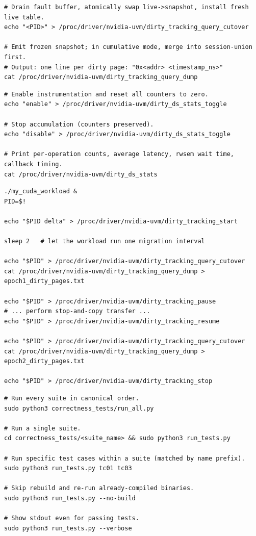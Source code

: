 
\begin{lstlisting}
# Drain fault buffer, atomically swap live->snapshot, install fresh live table.
echo "<PID>" > /proc/driver/nvidia-uvm/dirty_tracking_query_cutover

# Emit frozen snapshot; in cumulative mode, merge into session-union first.
# Output: one line per dirty page: "0x<addr> <timestamp_ns>"
cat /proc/driver/nvidia-uvm/dirty_tracking_query_dump
\end{lstlisting}


\begin{lstlisting}
# Enable instrumentation and reset all counters to zero.
echo "enable" > /proc/driver/nvidia-uvm/dirty_ds_stats_toggle

# Stop accumulation (counters preserved).
echo "disable" > /proc/driver/nvidia-uvm/dirty_ds_stats_toggle

# Print per-operation counts, average latency, rwsem wait time, callback timing.
cat /proc/driver/nvidia-uvm/dirty_ds_stats
\end{lstlisting}


\begin{lstlisting}
./my_cuda_workload &
PID=$!

echo "$PID delta" > /proc/driver/nvidia-uvm/dirty_tracking_start

sleep 2   # let the workload run one migration interval

echo "$PID" > /proc/driver/nvidia-uvm/dirty_tracking_query_cutover
cat /proc/driver/nvidia-uvm/dirty_tracking_query_dump > epoch1_dirty_pages.txt

echo "$PID" > /proc/driver/nvidia-uvm/dirty_tracking_pause
# ... perform stop-and-copy transfer ...
echo "$PID" > /proc/driver/nvidia-uvm/dirty_tracking_resume

echo "$PID" > /proc/driver/nvidia-uvm/dirty_tracking_query_cutover
cat /proc/driver/nvidia-uvm/dirty_tracking_query_dump > epoch2_dirty_pages.txt

echo "$PID" > /proc/driver/nvidia-uvm/dirty_tracking_stop
\end{lstlisting}


\begin{lstlisting}
# Run every suite in canonical order.
sudo python3 correctness_tests/run_all.py

# Run a single suite.
cd correctness_tests/<suite_name> && sudo python3 run_tests.py

# Run specific test cases within a suite (matched by name prefix).
sudo python3 run_tests.py tc01 tc03

# Skip rebuild and re-run already-compiled binaries.
sudo python3 run_tests.py --no-build

# Show stdout even for passing tests.
sudo python3 run_tests.py --verbose
\end{lstlisting}

